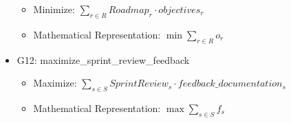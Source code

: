 \documentclass{article}
\begin{document}
\begin{itemize}
        \begin{itemize}
            \item Minimize: $\sum_{r \in R} Roadmap_{r} \cdot objectives_{r}$
            \item Mathematical Representation: $\min \sum_{r \in R} o_{r}$
        \end{itemize}
    \item G12: maximize\_sprint\_review\_feedback
        \begin{itemize}
            \item Maximize: $\sum_{s \in S} SprintReview_{s} \cdot feedback\_documentation_{s}$
            \item Mathematical Representation: $\max \sum_{s \in S} f_{s}$
        \end{itemize}
\end{itemize}
\end{document}
